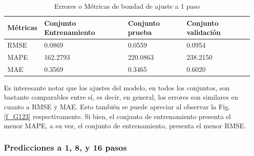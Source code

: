 \documentclass[12pt]{article}
\begin{document}
\begin{table}[h!]
  \centering
  \caption{Errores o Métricas de bondad de ajuste a 1 paso}
\begin{tabular}{|l|l|l|l|}
	\hline
	Métricas & Conjunto Entrenamiento & Conjunto prueba & Conjunto validación \\ \hline
	RMSE     & 0.0869                 & 0.0559          & 0.0954              \\ \hline
	MAPE     & 162.2793               & 220.0863        & 238.2150            \\ \hline
	MAE      & 0.3569                 & 0.3465          & 0.6020              \\ \hline
\end{tabular}
  \label{t_NoLinealp1}%
\end{table}%

Es interesante notar que los ajustes del modelo, en todos los conjuntos, son bastante comparables entre sí, es decir, en general, los errores son similares en cuanto a RMSE y MAE. Esto también se puede apreciar al observar la Fig. \ref{f_G123} respectivamente. Si bien, el conjunto de entrenamiento presenta el menor MAPE, a su vez, el conjunto de entrenamiento, presenta el menor RMSE.

\subsubsection{Predicciones a 1, 8, y 16
	pasos}
\end{document}
